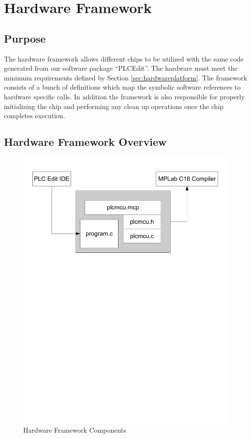 \section{Hardware Framework}
\label{sec:hardwareframework}

\subsection{Purpose}
The hardware framework allows different chips to be utilized with the same 
 code generated from our 
software package ``PLCEdit''.
The hardware must meet the minimum requirements defined by Section \ref{sec:hardwareplatform}. 
The framework consists of a bunch of definitions which map the symbolic software 
references to hardware specific calls. In addition the framework is also 
responsible for properly initializing the chip and performing any clean 
up operations once the chip completes execution.


\subsection{Hardware Framework Overview}

\begin{figure}[htp]
    \centering
    \includegraphics[trim= 10mm 150mm 10mm 10mm, clip, width=\imgmedium]{./images/hardwareframework.pdf}
    \caption{Hardware Framework Components}
    \label{fig:hardwareframework}
\end{figure}

